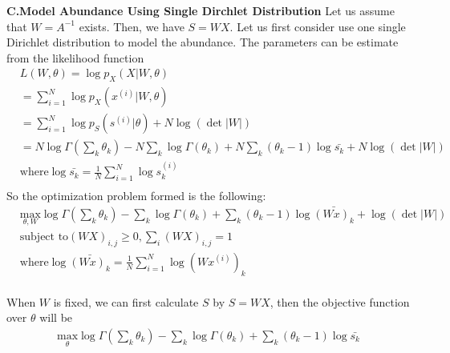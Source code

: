 \documentclass[14pt]{book}
\begin{document}
{\bf C.Model Abundance Using Single Dirchlet Distribution}  
Let us assume that $W = A^{-1}$ exists. Then, we have $S = WX$. Let us first consider use one single Dirichlet distribution to model the abundance. The parameters can be estimate from the likelihood function
\begin{equation}
\begin{aligned}
& L(W,\theta) = \log p_X(X | W,\theta) \\
&  =\sum_{i=1}^N \log p_X(x^{(i)} | W,\theta)\\
&  =\sum_{i=1}^N \log p_S(s^{(i)} | \theta)+N\log(\det|W|)\\
&  = N \log \Gamma(\sum_k \theta_k) - N \sum_k \log \Gamma(\theta_k) +  N \sum_k (\theta_k-1) \log \bar{s_k}+ N\log(\det|W|)\\
& \text{where}    \log \bar{s_k}  = \frac{1}{N} \sum_{i=1}^{N} \log s_{k}^{(i)}       \\
\end{aligned}
\end{equation}
So the optimization problem formed is the following: 
\begin{equation}
\begin{aligned}
& \underset{\theta,W}{\text{max}} \log \Gamma(\sum_k \theta_k) -  \sum_k \log \Gamma(\theta_k) +  \sum_k (\theta_k-1) \log \bar{(Wx)_k}+ \log(\det|W|)  \\
& \text{subject to}  (WX)_{i,j}\geq 0,\sum_i (WX)_{i,j} = 1\\
& \text{where}    \log \bar{(Wx)_k}  = \frac{1}{N} \sum_{i=1}^{N} \log (Wx^{(i)})_{k}    \\
\end{aligned}
\end{equation}

When $W$ is fixed, we can first calculate $S$ by $S=WX$, then the objective function over $\theta$  will be 
\begin{equation}
\begin{aligned}
\underset{\theta}{\text{max}} \log \Gamma(\sum_k \theta_k) -  \sum_k \log \Gamma(\theta_k) + \sum_k (\theta_k-1) \log \bar{s_k} \\
\end{aligned}
\end{equation}
\end{document}
